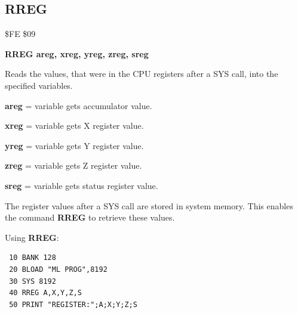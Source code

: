 \subsection{RREG}
\begin{description}[leftmargin=2cm,style=nextline]
\item [Token:] \$FE \$09
\item [Format:] {\bf RREG areg, xreg, yreg, zreg, sreg}
\item [Usage:] Reads the values, that were in the CPU registers
               after a SYS call, into the specified variables.

               {\bf areg} = variable gets accumulator value.

               {\bf xreg} = variable gets X register value.

               {\bf yreg} = variable gets Y register value.

               {\bf zreg} = variable gets Z register value.

               {\bf sreg} = variable gets status register value.

\item [Remarks:] The register values after a SYS call are stored
                 in system memory. This enables the command
                 {\bf RREG} to retrieve these values.

\item [Example:] Using {\bf RREG}:
\begin{tcolorbox}[colback=black,coltext=white]
\verbatimfont{\codefont}
\begin{verbatim}
 10 BANK 128
 20 BLOAD "ML PROG",8192
 30 SYS 8192
 40 RREG A,X,Y,Z,S
 50 PRINT "REGISTER:";A;X;Y;Z;S
\end{verbatim}
\end{tcolorbox}
\end{description}


\newpage
